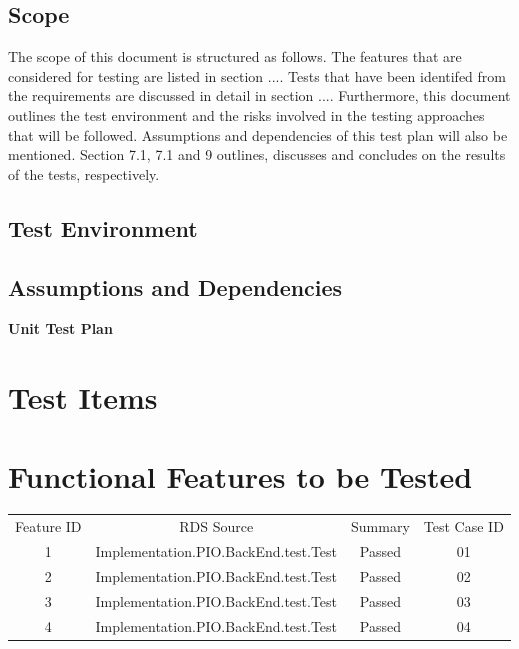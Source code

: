 \documentclass[a4paper,12pt]{article}
\begin{document}
\subsection{Scope}
The scope of this document is structured as follows. The features that are considered for
testing are listed in section .... Tests that have been identifed from the requirements are
discussed in detail in section .... Furthermore, this document outlines the test environment
and the risks involved in the testing approaches that will be followed. Assumptions and
dependencies of this test plan will also be mentioned. Section 7.1, 7.1 and 9 outlines,
discusses and concludes on the results of the tests, respectively.
\subsection{Test Environment}
\subsection{Assumptions and Dependencies}

\newpage
\begin{center}
{\huge \bfseries Unit Test Plan}\\[0.5cm]
\end{center}
\section{Test Items}

\section{Functional Features to be Tested}
\begin{center}
 \begin{tabular}{||c| c| c| c||} 
 \hline
 Feature ID & RDS Source & Summary & Test Case ID \\ [0.5ex]
 1 & Implementation.PIO.BackEnd.test.Test & Passed & 01 \\
 2 & Implementation.PIO.BackEnd.test.Test & Passed & 02 \\
 3 & Implementation.PIO.BackEnd.test.Test & Passed & 03 \\
 4 & Implementation.PIO.BackEnd.test.Test & Passed & 04 \\

 \hline\hline
\end{tabular}
\end{center}
\end{document}
